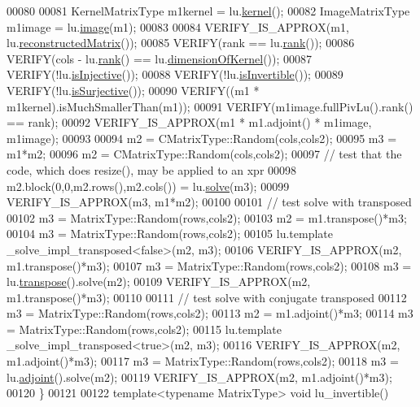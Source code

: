 \begin{DoxyCode}
00080 
00081   KernelMatrixType m1kernel = lu.\hyperlink{group___l_u___module_a70f52eeb2cd07dfbf790fce106fb4015}{kernel}();
00082   ImageMatrixType m1image = lu.\hyperlink{group___l_u___module_a0893985d2dab367baa6e57c6fd0c4956}{image}(m1);
00083 
00084   VERIFY\_IS\_APPROX(m1, lu.\hyperlink{group___l_u___module_a191a4f598b0c192a83ab48984e87ee51}{reconstructedMatrix}());
00085   VERIFY(rank == lu.\hyperlink{group___l_u___module_a67a870aa69e699e058d04802ba0bdad9}{rank}());
00086   VERIFY(cols - lu.\hyperlink{group___l_u___module_a67a870aa69e699e058d04802ba0bdad9}{rank}() == lu.\hyperlink{group___l_u___module_a64e191225834e91161ea53ad4b78167b}{dimensionOfKernel}());
00087   VERIFY(!lu.\hyperlink{group___l_u___module_ab13992c852aa593461d9b81790b56667}{isInjective}());
00088   VERIFY(!lu.\hyperlink{group___l_u___module_afdf2579c93473650f2ef2a47a376c4a0}{isInvertible}());
00089   VERIFY(!lu.\hyperlink{group___l_u___module_a1f6222875fc3a181ee1544b9b36dfda5}{isSurjective}());
00090   VERIFY((m1 * m1kernel).isMuchSmallerThan(m1));
00091   VERIFY(m1image.fullPivLu().rank() == rank);
00092   VERIFY\_IS\_APPROX(m1 * m1.adjoint() * m1image, m1image);
00093 
00094   m2 = CMatrixType::Random(cols,cols2);
00095   m3 = m1*m2;
00096   m2 = CMatrixType::Random(cols,cols2);
00097   \textcolor{comment}{// test that the code, which does resize(), may be applied to an xpr}
00098   m2.block(0,0,m2.rows(),m2.cols()) = lu.\hyperlink{group___l_u___module_af563471f6f3283fd10779ef02dd0b748}{solve}(m3);
00099   VERIFY\_IS\_APPROX(m3, m1*m2);
00100 
00101   \textcolor{comment}{// test solve with transposed}
00102   m3 = MatrixType::Random(rows,cols2);
00103   m2 = m1.transpose()*m3;
00104   m3 = MatrixType::Random(rows,cols2);
00105   lu.template \_solve\_impl\_transposed<false>(m2, m3);
00106   VERIFY\_IS\_APPROX(m2, m1.transpose()*m3);
00107   m3 = MatrixType::Random(rows,cols2);
00108   m3 = lu.\hyperlink{class_eigen_1_1_solver_base_a732e75b5132bb4db3775916927b0e86c}{transpose}().solve(m2);
00109   VERIFY\_IS\_APPROX(m2, m1.transpose()*m3);
00110 
00111   \textcolor{comment}{// test solve with conjugate transposed}
00112   m3 = MatrixType::Random(rows,cols2);
00113   m2 = m1.adjoint()*m3;
00114   m3 = MatrixType::Random(rows,cols2);
00115   lu.template \_solve\_impl\_transposed<true>(m2, m3);
00116   VERIFY\_IS\_APPROX(m2, m1.adjoint()*m3);
00117   m3 = MatrixType::Random(rows,cols2);
00118   m3 = lu.\hyperlink{class_eigen_1_1_solver_base_a05a3686a89888681c8e0c2bcab6d1ce5}{adjoint}().solve(m2);
00119   VERIFY\_IS\_APPROX(m2, m1.adjoint()*m3);
00120 \}
00121 
00122 \textcolor{keyword}{template}<\textcolor{keyword}{typename} MatrixType> \textcolor{keywordtype}{void} lu\_invertible()

\end{DoxyCode}
